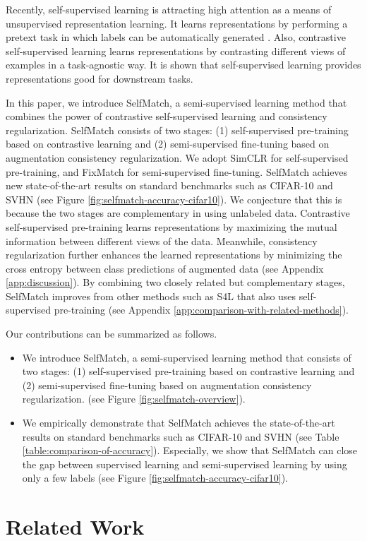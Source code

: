 \documentclass{article}
\begin{document}
Recently, self-supervised learning \cite{kolesnikov2019revisiting} is attracting high attention as a means of unsupervised representation learning. It learns representations by performing a pretext task in which labels can be automatically generated \cite{doersch2015unsupervised}\cite{zhang2016colorful}\cite{noroozi2016unsupervised}\cite{gidaris2018unsupervised}. Also, contrastive self-supervised learning \cite{hjelm2019learning}\cite{oord2018representation}\cite{bachman2019learning}\cite{chen2020simple}\cite{tian2020contrastive}\cite{he2020momentum}\cite{tschannen2020mutual} learns representations by contrasting different views of examples in a task-agnostic way. It is shown that self-supervised learning provides representations good for downstream tasks.

In this paper, we introduce SelfMatch, a semi-supervised learning method that combines the power of contrastive self-supervised learning and consistency regularization. SelfMatch consists of two stages: (1) self-supervised pre-training based on contrastive learning and (2) semi-supervised fine-tuning based on augmentation consistency regularization. We adopt SimCLR \cite{chen2020simple} for self-supervised pre-training, and FixMatch \cite{sohn2020fixmatch} for semi-supervised fine-tuning. SelfMatch achieves new state-of-the-art results on standard benchmarks such as CIFAR-10 \cite{krizhevsky2009learning} and SVHN \cite{netzer2011reading} (see Figure \ref{fig:selfmatch-accuracy-cifar10}). We conjecture that this is because the two stages are complementary in using unlabeled data. Contrastive self-supervised pre-training learns representations by maximizing the mutual information between different views of the data. Meanwhile, consistency regularization further enhances the learned representations by minimizing the cross entropy between class predictions of augmented data (see Appendix \ref{app:discussion}). By combining two closely related but complementary stages, SelfMatch improves from other methods such as S4L \cite{zhai2019s4l} that also uses self-supervised pre-training (see Appendix \ref{app:comparison-with-related-methods}).

Our contributions can be summarized as follows.
\begin{itemize}
    \item We introduce SelfMatch, a semi-supervised learning method that consists of two stages: (1) self-supervised pre-training based on contrastive learning and (2) semi-supervised fine-tuning based on augmentation consistency regularization. (see Figure \ref{fig:selfmatch-overview}). 
    \item We empirically demonstrate that SelfMatch achieves the state-of-the-art results on standard benchmarks such as CIFAR-10 and SVHN (see Table \ref{table:comparison-of-accuracy}). Especially, we show that SelfMatch can close the gap between supervised learning and semi-supervised learning by using only a few labels (see Figure \ref{fig:selfmatch-accuracy-cifar10}).
\end{itemize} \section{Related Work}
\label{section:related-work}
\end{document}
